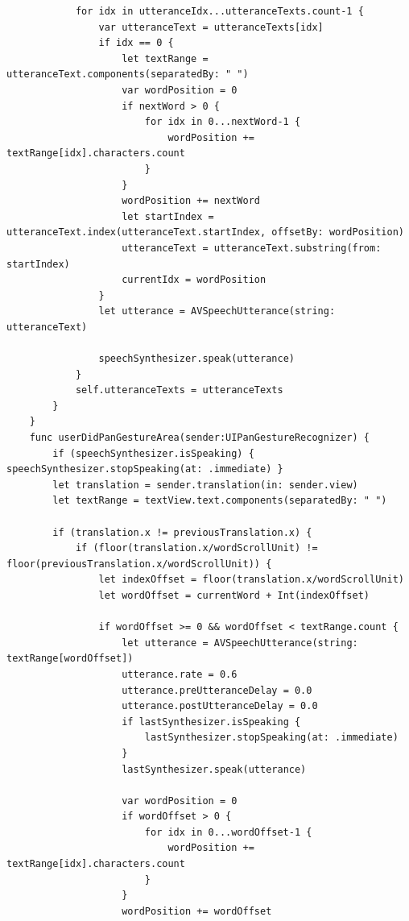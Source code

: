 \begin{lstlisting}
            for idx in utteranceIdx...utteranceTexts.count-1 {
                var utteranceText = utteranceTexts[idx]
                if idx == 0 {
                    let textRange = utteranceText.components(separatedBy: " ")
                    var wordPosition = 0
                    if nextWord > 0 {
                        for idx in 0...nextWord-1 {
                            wordPosition += textRange[idx].characters.count
                        }
                    }
                    wordPosition += nextWord
                    let startIndex = utteranceText.index(utteranceText.startIndex, offsetBy: wordPosition)
                    utteranceText = utteranceText.substring(from: startIndex)
                    currentIdx = wordPosition
                }
                let utterance = AVSpeechUtterance(string: utteranceText)
                
                speechSynthesizer.speak(utterance)
            }
            self.utteranceTexts = utteranceTexts
        }
    }
    func userDidPanGestureArea(sender:UIPanGestureRecognizer) {
        if (speechSynthesizer.isSpeaking) { speechSynthesizer.stopSpeaking(at: .immediate) }
        let translation = sender.translation(in: sender.view)
        let textRange = textView.text.components(separatedBy: " ")
        
        if (translation.x != previousTranslation.x) {
            if (floor(translation.x/wordScrollUnit) != floor(previousTranslation.x/wordScrollUnit)) {
                let indexOffset = floor(translation.x/wordScrollUnit)
                let wordOffset = currentWord + Int(indexOffset)
                
                if wordOffset >= 0 && wordOffset < textRange.count {
                    let utterance = AVSpeechUtterance(string: textRange[wordOffset])
                    utterance.rate = 0.6
                    utterance.preUtteranceDelay = 0.0
                    utterance.postUtteranceDelay = 0.0
                    if lastSynthesizer.isSpeaking {
                        lastSynthesizer.stopSpeaking(at: .immediate)
                    }
                    lastSynthesizer.speak(utterance)
                    
                    var wordPosition = 0
                    if wordOffset > 0 {
                        for idx in 0...wordOffset-1 {
                            wordPosition += textRange[idx].characters.count
                        }
                    }
                    wordPosition += wordOffset
                    

\end{lstlisting}

